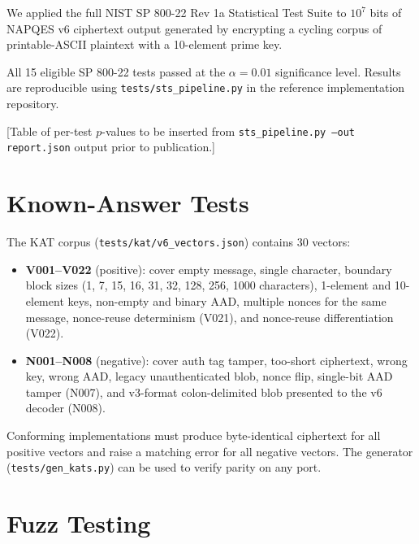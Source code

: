 \documentclass[11pt,a4paper]{article}
\begin{document}
We applied the full NIST SP 800-22 Rev 1a Statistical Test Suite to
$10^7$ bits of NAPQES v6 ciphertext output generated by encrypting a
cycling corpus of printable-ASCII plaintext with a 10-element prime key.

All 15 eligible SP 800-22 tests passed at the $\alpha = 0.01$ significance
level.  Results are reproducible using \texttt{tests/sts\_pipeline.py}
in the reference implementation repository.

[Table of per-test $p$-values to be inserted from \texttt{sts\_pipeline.py --out report.json} output prior to publication.]

\section{Known-Answer Tests}
\label{sec:kats}

The KAT corpus (\texttt{tests/kat/v6\_vectors.json}) contains 30 vectors:

\begin{itemize}
  \item \textbf{V001--V022} (positive): cover empty message, single character,
        boundary block sizes (1, 7, 15, 16, 31, 32, 128, 256, 1000 characters),
        1-element and 10-element keys, non-empty and binary AAD, multiple
        nonces for the same message, nonce-reuse determinism (V021), and
        nonce-reuse differentiation (V022).
  \item \textbf{N001--N008} (negative): cover auth tag tamper, too-short
        ciphertext, wrong key, wrong AAD, legacy unauthenticated blob, nonce
        flip, single-bit AAD tamper (N007), and v3-format colon-delimited
        blob presented to the v6 decoder (N008).
\end{itemize}

Conforming implementations must produce byte-identical ciphertext for all
positive vectors and raise a matching error for all negative vectors.  The
generator (\texttt{tests/gen\_kats.py}) can be used to verify parity on any
port.

\section{Fuzz Testing}
\label{sec:fuzz}
\end{document}
